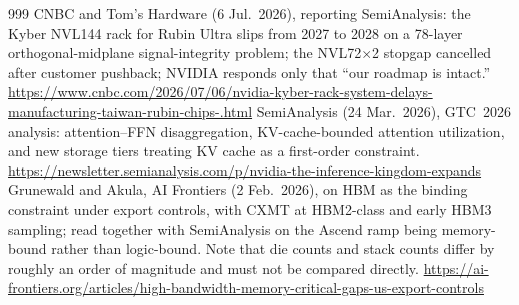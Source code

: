 \begin{thebibliography}{999}
 CNBC and Tom's Hardware (6 Jul.\ 2026), reporting SemiAnalysis: the Kyber NVL144 rack for Rubin Ultra slips from 2027 to 2028 on a 78-layer orthogonal-midplane signal-integrity problem; the NVL72$\times$2 stopgap cancelled after customer pushback; NVIDIA responds only that ``our roadmap is intact.'' \url{https://www.cnbc.com/2026/07/06/nvidia-kyber-rack-system-delays-manufacturing-taiwan-rubin-chips-.html}
 SemiAnalysis (24 Mar.\ 2026), GTC~2026 analysis: attention--FFN disaggregation, KV-cache-bounded attention utilization, and new storage tiers treating KV cache as a first-order constraint. \url{https://newsletter.semianalysis.com/p/nvidia-the-inference-kingdom-expands}
 Grunewald and Akula, AI Frontiers (2 Feb.\ 2026), on HBM as the binding constraint under export controls, with CXMT at HBM2-class and early HBM3 sampling; read together with SemiAnalysis on the Ascend ramp being memory-bound rather than logic-bound. Note that die counts and stack counts differ by roughly an order of magnitude and must not be compared directly. \url{https://ai-frontiers.org/articles/high-bandwidth-memory-critical-gaps-us-export-controls}



\end{thebibliography}
